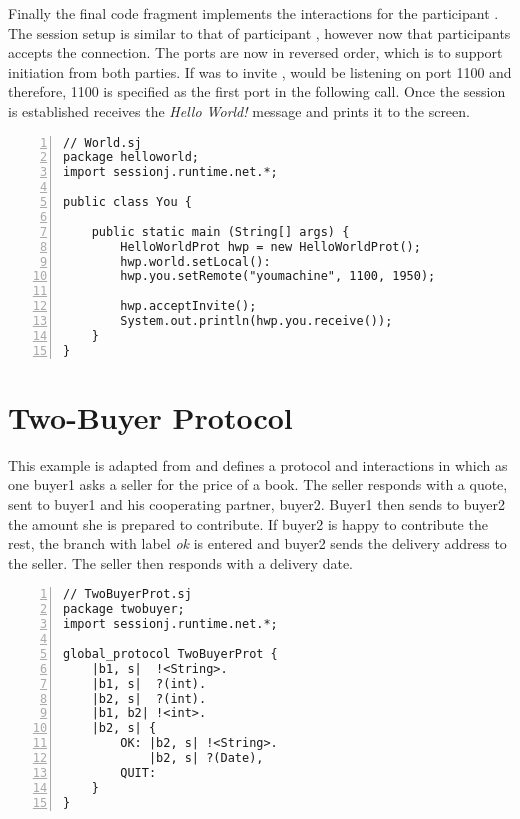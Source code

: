 Finally the final code fragment implements the interactions for the participant . The session setup is similar to that of participant , however now that participants accepts the connection. The ports are now in reversed order, which is to support initiation from both parties. If  was to invite ,  would be listening on port 1100 and therefore, 1100 is specified as the first port in the following  call. Once the session is established  receives the \textit{Hello World!} message and prints it to the screen.

\begin{lstlisting}[basicstyle=\LISTINGSTYLE, numbers=left, caption=Implementation for participant \textit{world}]
// World.sj
package helloworld; 
import sessionj.runtime.net.*;
 
public class You {
	
	public static main (String[] args) {
		HelloWorldProt hwp = new HelloWorldProt();
		hwp.world.setLocal():
		hwp.you.setRemote("youmachine", 1100, 1950);
	
		hwp.acceptInvite();
		System.out.println(hwp.you.receive());
	} 
}
\end{lstlisting}

\section{Two-Buyer Protocol}

This example is adapted from \cite{multiparty_sess_types} and defines a protocol and interactions in which as one buyer1 asks a seller for the price of a book. The seller responds with a quote, sent to buyer1 and his cooperating partner, buyer2. Buyer1 then sends to buyer2 the amount she is prepared to contribute. If buyer2 is happy to contribute the rest, the branch with label \textit{ok} is entered and buyer2 sends the delivery address to the seller. The seller then responds with a delivery date.

\begin{lstlisting}[basicstyle=\LISTINGSTYLE, numbers=left, caption=Global Declaration of \textit{HelloWorldProt}]
// TwoBuyerProt.sj
package twobuyer; 
import sessionj.runtime.net.*;
 
global_protocol TwoBuyerProt {
	|b1, s|  !<String>.
	|b1, s|  ?(int).
	|b2, s|  ?(int).
	|b1, b2| !<int>.
	|b2, s| {
		OK: |b2, s| !<String>.
			|b2, s| ?(Date),
		QUIT:
	}	
}
\end{lstlisting}

